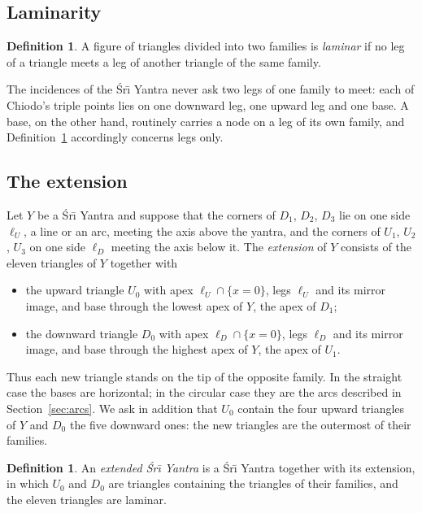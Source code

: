 \documentclass[11pt,a4paper]{article}
\theoremstyle{definition}
\newtheorem{definition}[theorem]{Definition}
\theoremstyle{remark}
\newcommand{\Sri}{\'Sr\={\i}}
\begin{document}
\subsection{Laminarity}

\begin{definition}\label{def:laminar}
A figure of triangles divided into two families is \emph{laminar} if no leg of a triangle meets a leg of
another triangle of the same family.
\end{definition}

The incidences of the \Sri{} Yantra never ask two legs of one family to meet: each of Chiodo's triple
points lies on one downward leg, one upward leg and one base. A base, on the other hand, routinely
carries a node on a leg of its own family, and Definition~\ref{def:laminar} accordingly concerns legs
only.

\subsection{The extension}
Let $Y$ be a \Sri{} Yantra and suppose that the corners of $D_1$, $D_2$, $D_3$ lie on one side $\ell_U$,
a line or an arc, meeting the axis above the yantra, and the corners of $U_1$, $U_2$, $U_3$ on one side
$\ell_D$ meeting the axis below it. The \emph{extension} of $Y$ consists of the eleven triangles of $Y$
together with
\begin{itemize}[leftmargin=2em]
\item the upward triangle $U_0$ with apex $\ell_U \cap \{x=0\}$, legs $\ell_U$ and its mirror image, and
base through the lowest apex of $Y$, the apex of $D_1$;
\item the downward triangle $D_0$ with apex $\ell_D \cap \{x=0\}$, legs $\ell_D$ and its mirror image, and
base through the highest apex of $Y$, the apex of $U_1$.
\end{itemize}
Thus each new triangle stands on the tip of the opposite family. In the straight case the bases are
horizontal; in the circular case they are the arcs described in Section~\ref{sec:arcs}. We ask in
addition that $U_0$ contain the four upward triangles of $Y$ and $D_0$ the five downward ones: the new
triangles are the outermost of their families.

\begin{definition}\label{def:extended}
An \emph{extended \Sri{} Yantra} is a \Sri{} Yantra together with its extension, in which $U_0$ and $D_0$
are triangles containing the triangles of their families, and the eleven triangles are laminar.
\end{definition}
\end{document}
